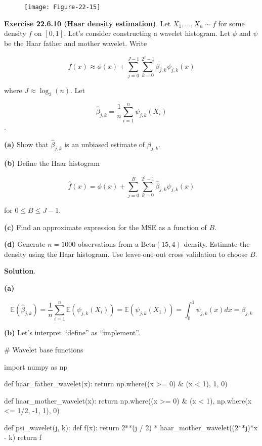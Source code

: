 \begin{figure}[H]
\texttt{[image: Figure-22-15]}
\end{figure}

\textbf{Exercise 22.6.10 (Haar density estimation)}. Let
\(X_1, \dots, X_n \sim f\) for some density \(f\) on \([0, 1]\). Let's
consider constructing a wavelet histogram. Let \(\phi\) and \(\psi\) be
the Haar father and mother wavelet. Write

\[ f(x) \approx \phi(x) + \sum_{j=0}^{J - 1} \sum_{k=0}^{2^j - 1} \beta_{j, k} \psi_{j, k}(x) \]

where \(J \approx \log_2(n)\). Let

\[ \hat{\beta}_{j, k} = \frac{1}{n} \sum_{i=1}^n \psi_{j, k}(X_i) \].

\textbf{(a)} Show that \(\hat{\beta}_{j, k}\) is an unbiased estimate of
\(\beta_{j, k}\).

\textbf{(b)} Define the Haar histogram

\[ \hat{f}(x) = \phi(x) + \sum_{j=0}^{B} \sum_{k=0}^{2^j - 1} \hat{\beta}_{j, k} \psi_{j, k}(x) \]

for \(0 \leq B \leq J - 1\).

\textbf{(c)} Find an approximate expression for the MSE as a function of
\(B\).

\textbf{(d)} Generate \(n = 1000\) observations from a
\(\text{Beta}(15, 4)\) density. Estimate the density using the Haar
histogram. Use leave-one-out cross validation to choose \(B\).

\textbf{Solution}.

\textbf{(a)}

\[ \mathbb{E}(\hat{\beta}_{j, k}) = \frac{1}{n} \sum_{i=1}^n \mathbb{E}(\psi_{j, k}(X_i))
= \mathbb{E}(\psi_{j, k}(X_1)) = \int_0^1 \psi_{j, k}(x) dx = \beta_{j, k} \]

\textbf{(b)} Let's interpret ``define'' as ``implement''.

\begin{python}
# Wavelet base functions

import numpy as np

def haar_father_wavelet(x):
    return np.where((x >= 0) & (x < 1), 1, 0)

def haar_mother_wavelet(x):
    return np.where((x >= 0) & (x < 1),  np.where(x <= 1/2, -1, 1), 0)

def psi_wavelet(j, k):
    def f(x):
        return 2**(j / 2) * haar_mother_wavelet((2**j)*x - k)
    return f
\end{python}

